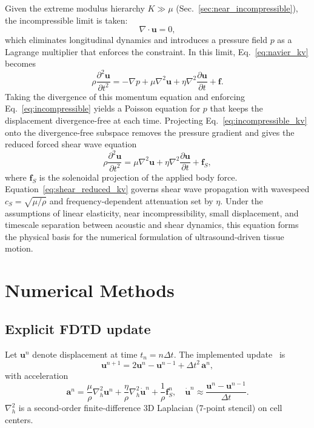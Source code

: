 \documentclass{iopjournal}
\begin{document}
Given the extreme modulus hierarchy $K \gg \mu$
(Sec.~\ref{sec:near_incompressible}), the incompressible limit is taken:
\begin{equation}
\nabla \cdot \mathbf{u} = 0,
\label{eq:incompressible}
\end{equation}
which eliminates longitudinal dynamics and introduces a pressure field $p$ as a
Lagrange multiplier that enforces the constraint. In this limit,
Eq.~\eqref{eq:navier_kv} becomes
\begin{equation}
\rho \frac{\partial^2 \mathbf{u}}{\partial t^2}
=
-\nabla p + \mu \nabla^2 \mathbf{u}
+ \eta \nabla^2 \frac{\partial \mathbf{u}}{\partial t}
+ \mathbf{f}.
\label{eq:incompressible_kv}
\end{equation}
Taking the divergence of this momentum equation and enforcing
Eq.~\eqref{eq:incompressible} yields a Poisson equation for $p$ that keeps the
displacement divergence-free at each time. Projecting
Eq.~\eqref{eq:incompressible_kv} onto the divergence-free subspace removes the
pressure gradient and gives the reduced forced shear wave equation
\begin{equation}
\rho \frac{\partial^2 \mathbf{u}}{\partial t^2}
=
\mu \nabla^2 \mathbf{u}
+ \eta \nabla^2 \frac{\partial \mathbf{u}}{\partial t}
+ \mathbf{f}_S,
\label{eq:shear_reduced_kv}
\end{equation}
where $\mathbf{f}_S$ is the solenoidal projection of the applied body force.
Equation~\eqref{eq:shear_reduced_kv} governs shear wave propagation with
wavespeed $c_S = \sqrt{\mu/\rho}$ and frequency-dependent attenuation set by
$\eta$. Under the assumptions of linear elasticity, near incompressibility,
small displacement, and timescale separation between acoustic and shear
dynamics, this equation forms the physical basis for the numerical formulation
of ultrasound-driven tissue motion.

\section{Numerical Methods}
\label{sec:numerical_methods}

\subsection{Explicit FDTD update}
Let $\bm{u}^n$ denote displacement at time $t_n=n\Delta t$. The
implemented update~\cite{taflove2005computational} is
\begin{equation}
\bm{u}^{n+1}
=
2\bm{u}^{n} - \bm{u}^{n-1}
+
\Delta t^2 \, \bm{a}^{n},
\end{equation}
with acceleration
\begin{equation}
\bm{a}^{n}
=
\frac{\mu}{\rho}\nabla_h^2 \bm{u}^{n}
+
\frac{\eta}{\rho}\nabla_h^2 \dot{\bm{u}}^{n}
+
\frac{1}{\rho}\bm{f}_S^{n},
\quad
\dot{\bm{u}}^{n}\approx\frac{\bm{u}^{n}-\bm{u}^{n-1}}{\Delta t}.
\end{equation}
$\nabla_h^2$ is a second-order finite-difference 3D Laplacian (7-point stencil)
on cell centers.
\end{document}
